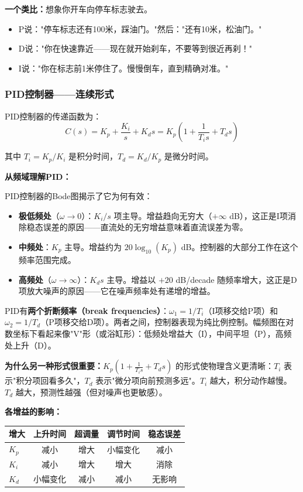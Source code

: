 \textbf{一个类比：}想象你开车向停车标志驶去。
\begin{itemize}
    \item P说："停车标志还有100米，踩油门。"然后："还有10米，松油门。"
    \item D说："你在快速靠近——现在就开始刹车，不要等到很近再刹！"
    \item I说："你在标志前1米停住了。慢慢倒车，直到精确对准。"
\end{itemize}

\subsubsection{PID控制器——连续形式}

PID控制器的传递函数为：
\begin{equation}
C(s) = K_p + \frac{K_i}{s} + K_d s = K_p \left(1 + \frac{1}{T_i s} + T_d s\right)
\end{equation}

其中 $T_i = K_p / K_i$ 是积分时间，$T_d = K_d / K_p$ 是微分时间。

\textbf{从频域理解PID：}

PID控制器的Bode图揭示了它为何有效：
\begin{itemize}
    \item \textbf{极低频处}（$\omega \to 0$）：$K_i/s$ 项主导。增益趋向无穷大（$+\infty$ dB），这正是I项消除稳态误差的原因——直流处的无穷增益意味着直流误差为零。
    \item \textbf{中频处}：$K_p$ 主导。增益约为 $20\log_{10}(K_p)$ dB。控制器的大部分工作在这个频率范围完成。
    \item \textbf{高频处}（$\omega \to \infty$）：$K_d s$ 主导。增益以 $+20$ dB/decade 随频率增大，这正是D项放大噪声的原因——它在噪声频率处有递增的增益。
\end{itemize}

PID有\textbf{两个折断频率（break frequencies）}：$\omega_1 = 1/T_i$（I项移交给P项）和 $\omega_2 = 1/T_d$（P项移交给D项）。两者之间，控制器表现为纯比例控制。幅频图在对数坐标下看起来像"V"形（或浴缸形）：低频处增益大（I），中间平坦（P），高频处上升（D）。

\textbf{为什么另一种形式很重要：}$K_p(1 + \frac{1}{T_i s} + T_d s)$ 的形式使物理含义更清晰：$T_i$ 表示"积分项回看多久"，$T_d$ 表示"微分项向前预测多远"。$T_i$ 越大，积分动作越慢。$T_d$ 越大，预测性越强（但对噪声也更敏感）。

\textbf{各增益的影响：}

\begin{center}
\begin{tabular}{lcccc}
\toprule
\textbf{增大} & \textbf{上升时间} & \textbf{超调量} & \textbf{调节时间} & \textbf{稳态误差} \\
\midrule
$K_p$ & 减小 & 增大 & 小幅变化 & 减小 \\
$K_i$ & 减小 & 增大 & 增大 & 消除 \\
$K_d$ & 小幅变化 & 减小 & 减小 & 无影响 \\
\bottomrule
\end{tabular}
\end{center}

